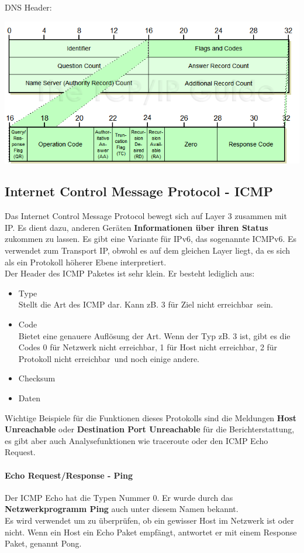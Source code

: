 \documentclass[12pt,a4paper]{report}
\begin{document}
DNS Header:\\
\begin{center}
\includegraphics[scale=0.7]{../docs/tarkes/pics/dnsheader.png}
\end{center}
\subsection{Internet Control Message Protocol - ICMP}
Das Internet Control Message Protocol bewegt sich auf Layer 3 zusammen mit IP. Es dient dazu, anderen Geräten \textbf{Informationen über ihren Status} zukommen zu lassen. Es gibt eine Variante für IPv6, das sogenannte ICMPv6. Es verwendet zum Transport IP, obwohl es auf dem gleichen Layer liegt, da es sich als ein Protokoll höherer Ebene interpretiert.\\

Der Header des ICMP Paketes ist sehr klein. Er besteht lediglich aus:
\begin{itemize}
\item Type\\
Stellt die Art des ICMP dar. Kann zB. 3 für \glqq Ziel nicht erreichbar\grqq \ sein.
\item Code\\
Bietet eine genauere Auflösung der Art. Wenn der Typ zB. 3 ist, gibt es die Codes 0 für \glqq Netzwerk nicht erreichbar\grqq , 1 für \glqq Host nicht erreichbar\grqq , 2 für \glqq Protokoll nicht erreichbar\grqq \ und noch einige andere.
\item Checksum
\item Daten
\end{itemize}

Wichtige Beispiele für die Funktionen dieses Protokolls sind die Meldungen \textbf{Host Unreachable} oder \textbf{Destination Port Unreachable} für die Berichterstattung, es gibt aber auch Analysefunktionen wie traceroute oder den ICMP Echo Request. 
\paragraph{Echo Request/Response - Ping}
Der ICMP Echo hat die Typen Nummer 0. Er wurde durch das \textbf{Netzwerkprogramm Ping} auch unter diesem Namen bekannt.\\
Es wird verwendet um zu überprüfen, ob ein gewisser Host im Netzwerk ist oder nicht. Wenn ein Host ein Echo Paket empfängt, antwortet er mit einem Response Paket, genannt Pong.\\
\end{document}
